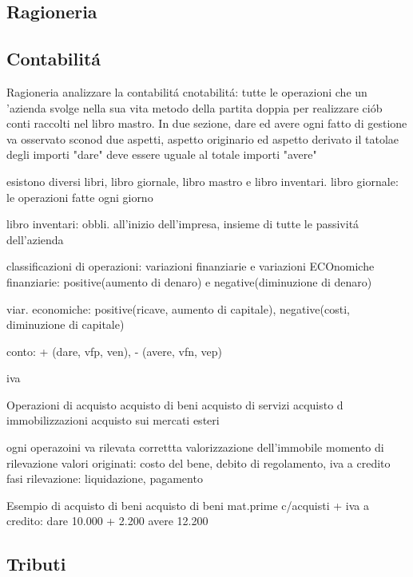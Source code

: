 \documentclass{article}
\begin{document}
\subsection{Ragioneria}

\subsection{Contabilit\'a}
Ragioneria analizzare la contabilit\'a 
cnotabilit\'a: tutte le operazioni che un 'azienda svolge nella sua vita
metodo della partita doppia per realizzare ci\'ob
conti raccolti nel libro mastro. In due sezione, dare ed avere
ogni fatto di gestione va osservato sconod due aspetti, aspetto originario ed aspetto derivato
il tatolae degli importi "dare" deve essere uguale al totale importi "avere"

esistono diversi libri, libro giornale, libro mastro e libro inventari.
libro giornale: le operazioni fatte ogni giorno

libro inventari: obbli. all'inizio dell'impresa, insieme di tutte le passivit\'a dell'azienda

classificazioni di operazioni:
variazioni finanziarie e variazioni ECOnomiche
finanziarie: positive(aumento di denaro) e negative(diminuzione di denaro)

viar. economiche: positive(ricave, aumento di capitale), negative(costi, diminuzione di capitale)

conto: + (dare, vfp, ven), - (avere, vfn, vep)

iva

Operazioni di acquisto
acquisto di beni
acquisto di servizi
acquisto d immobilizzazioni
acquisto sui mercati esteri

ogni operazoini va rilevata
correttta valorizzazione dell'immobile
momento di rilevazione
valori originati: costo del bene, debito di regolamento, iva a credito
fasi rilevazione: liquidazione, pagamento

Esempio di acquisto di beni
acquisto di beni
mat.prime c/acquisti +  iva a credito: dare 10.000 + 2.200
avere 12.200



\subsection{Tributi}
\end{document}
